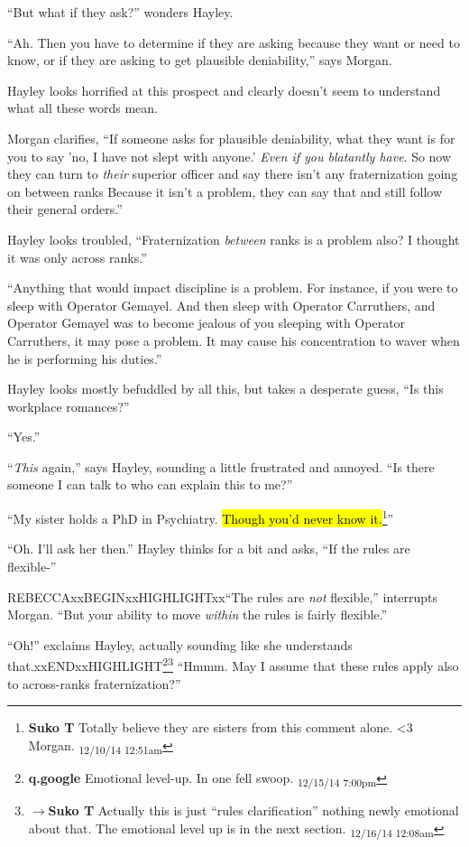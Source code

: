 ``But what if they ask?'' wonders Hayley.

``Ah.  Then you have to determine if they are asking because they want or need to know, or if they are asking to get plausible deniability,'' says Morgan.

Hayley looks horrified at this prospect and clearly doesn't seem to understand what all these words mean.

Morgan clarifies, ``If someone asks for plausible deniability, what they want is for you to say 'no, I have not slept with anyone.' \textit{Even if you blatantly have}.  So now they can turn to \textit{their }superior officer and say there isn't any fraternization going on between ranks  Because it isn't a problem, they can say that and still follow their general orders.''

Hayley looks troubled, ``Fraternization \textit{between} ranks is a problem also?  I thought it was only across ranks.''

``Anything that would impact discipline is a problem.  For instance, if you were to sleep with Operator Gemayel.  And then sleep with Operator Carruthers, and Operator Gemayel was to become jealous of you sleeping with Operator Carruthers, it may pose a problem.  It may cause his concentration to waver when he is performing his duties.''

Hayley looks mostly befuddled by all this, but takes a desperate guess, ``Is this workplace romances?''

``Yes.''

``\textit{This} again,'' says Hayley, sounding a little frustrated and annoyed.  ``Is there someone I can talk to who can explain this to me?''

``My sister holds a PhD in Psychiatry.  \hl{Though you'd never know it.}\footnote{\textbf{Suko T }Totally believe they are sisters from this comment alone.  \textless 3 Morgan. \textsubscript{12/10/14 12:51am}}''

``Oh.  I'll ask her then.''  Hayley thinks for a bit and asks, ``If the rules are flexible-''

REBECCAxxBEGINxxHIGHLIGHTxx``The rules are \textit{not} flexible,'' interrupts Morgan. ``But your ability to move \textit{within} the rules is fairly flexible.''

``Oh!'' exclaims Hayley, actually sounding like she understands that.xxENDxxHIGHLIGHT\footnote{\textbf{q.google }Emotional level-up.  In one fell swoop. \textsubscript{12/15/14 7:00pm}}\footnote{$\rightarrow$\textbf{Suko T }Actually this is just ``rules clarification'' nothing newly emotional about that.  The emotional level up is in the next section. \textsubscript{12/16/14 12:08am}}  ``Hmmm.  May I assume that these rules apply also to across-ranks fraternization?''

